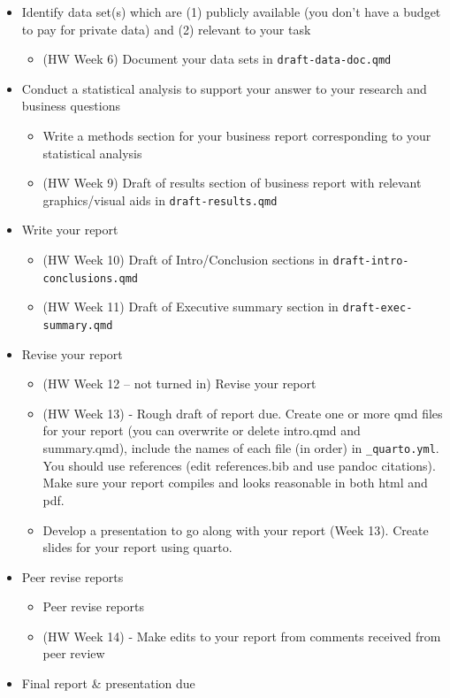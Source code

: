 \documentclass[
  letterpaper,
  DIV=11,
  numbers=noendperiod]{scrreprt}
\providecommand{\tightlist}{%
  \setlength{\itemsep}{0pt}\setlength{\parskip}{0pt}}\usepackage{longtable,booktabs,array}
\begin{document}
\begin{itemize}
\item
  Identify data set(s) which are (1) publicly available (you don't have
  a budget to pay for private data) and (2) relevant to your task

  \begin{itemize}
  \tightlist
  \item
    (HW Week 6) Document your data sets in \texttt{draft-data-doc.qmd}
  \end{itemize}
\item
  Conduct a statistical analysis to support your answer to your research
  and business questions

  \begin{itemize}
  \item
    Write a methods section for your business report corresponding to
    your statistical analysis
  \item
    (HW Week 9) Draft of results section of business report with
    relevant graphics/visual aids in \texttt{draft-results.qmd}
  \end{itemize}
\item
  Write your report

  \begin{itemize}
  \item
    (HW Week 10) Draft of Intro/Conclusion sections in
    \texttt{draft-intro-conclusions.qmd}
  \item
    (HW Week 11) Draft of Executive summary section in
    \texttt{draft-exec-summary.qmd}
  \end{itemize}
\item
  Revise your report

  \begin{itemize}
  \item
    (HW Week 12 -- not turned in) Revise your report
  \item
    (HW Week 13) - Rough draft of report due. Create one or more qmd
    files for your report (you can overwrite or delete intro.qmd and
    summary.qmd), include the names of each file (in order) in
    \texttt{\_quarto.yml}. You should use references (edit
    references.bib and use pandoc citations). Make sure your report
    compiles and looks reasonable in both html and pdf.
  \item
    Develop a presentation to go along with your report (Week 13).
    Create slides for your report using quarto.
  \end{itemize}
\item
  Peer revise reports

  \begin{itemize}
  \item
    Peer revise reports
  \item
    (HW Week 14) - Make edits to your report from comments received from
    peer review
  \end{itemize}
\item
  Final report \& presentation due
\end{itemize}
\end{document}
